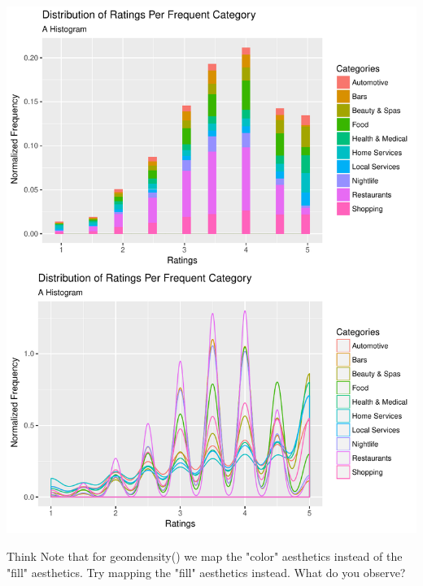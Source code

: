 \documentclass[12pt]{book}\usepackage{knitr}
\begin{document}
\begin{knitrout}
\begin{kframe}
{\ttfamily\noindent\itshape\color{messagecolor}{\#\# `stat\_bin()` using `bins = 30`. Pick better value with `binwidth`.}}\end{kframe}
\includegraphics[width=\maxwidth]{figure/unnamed-chunk-38-1} 
\begin{kframe}\begin{alltt}
\end{alltt}
\end{kframe}
\end{knitrout}

\begin{DIY}{Think}
\noindent Note that for geom\textunderscore density() we map the "color" aesthetics instead of the 
"fill" aesthetics. Try mapping the "fill" aesthetics instead. What do you observe?
\end{DIY}
\end{document}
